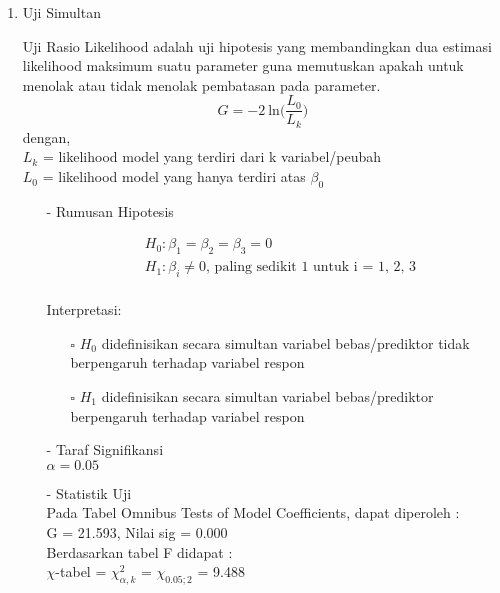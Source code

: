 \begin{enumerate}
    \def\labelenumi{\arabic{enumi}.}
    \tightlist
    \item Uji Simultan
    \begin{sloppypar}
    Uji Rasio Likelihood adalah uji hipotesis yang membandingkan dua estimasi likelihood maksimum suatu parameter guna memutuskan apakah untuk menolak atau tidak menolak pembatasan pada parameter. $$G = -2\ \text{ln} \Big( \frac{L_0}{L_k} \Big)$$
    dengan, \\$L_k$ = likelihood model yang terdiri dari k variabel/peubah \\$L_0$ = likelihood model yang hanya terdiri atas $\beta_0$
    \end{sloppypar}
    \begin{test}{
    \begin{enumerate}
        \item[-] Rumusan Hipotesis \\
        \begin{fleqn}[\parindent]
            \begin{equation*}
            \begin{split}
            &H_0 : \beta_1 = \beta_2 = \beta_3 = 0 \\ 
            &H_1 : \beta_i \neq 0 \text{, paling sedikit 1 untuk i = 1, 2, 3} \\
            \end{split}
            \end{equation*}
        \end{fleqn}
        Interpretasi:
        \begin{enumerate}
        \item[$\square$] $H_0$ didefinisikan secara simultan variabel bebas/prediktor tidak berpengaruh terhadap variabel respon
        \item[$\square$] $H_1$ didefinisikan secara simultan variabel bebas/prediktor berpengaruh terhadap variabel respon
        \end{enumerate}
    
        \item[-] Taraf Signifikansi \\
        $\alpha = 0.05$
    
        \item[-] Statistik Uji \\
        Pada Tabel Omnibus Tests of Model Coefficients, dapat diperoleh : \\
        G = 21.593, Nilai sig = 0.000 \\
        Berdasarkan tabel F didapat : \\
        $\chi$-tabel = $\chi_{\alpha, k}^2$ = $\chi_{0.05; 2}$ = 9.488
    

\end{enumerate}}
\end{test}
\end{enumerate}
